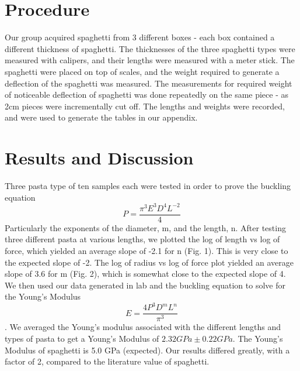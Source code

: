 \documentclass[12pt]{article}
\begin{document}
\section{Procedure}

Our group acquired spaghetti from 3 different boxes - each box contained a different thickness of spaghetti. The thicknesses of the three spaghetti types were measured with calipers, and their lengths were measured with a meter stick. The spaghetti were placed on top of scales, and the weight required to generate a deflection of the spaghetti was measured. The measurements for required weight of noticeable deflection of spaghetti was done repeatedly on the same piece - as 2cm pieces were incrementally cut off. The lengths and weights were recorded, and were used to generate the tables in our appendix.

\section{Results and Discussion}

Three pasta type of ten samples each were tested in order to prove the buckling equation
$$P=\frac{\pi ^3E^3D^4L^{-2}}{4}$$
Particularly the exponents of the diameter, m, and the length, n. After testing three different pasta at various lengths, we plotted the log of length vs log of force, which yielded an average slope of -2.1 for n (Fig. 1). This is very close to the expected slope of -2. The log of radius vs log of force plot yielded an average slope of 3.6 for m (Fig. 2), which is somewhat close to the expected slope of 4. We then used our data generated in lab and the buckling equation to solve for the Young's Modulus $$E=\frac{4P^3D^mL^n}{\pi ^3}$$. We averaged the Young's modulus associated with the different lengths and types of pasta to get a Young's Modulus of $2.32 GPa \pm 0.22 GPa$. The Young's Modulus of spaghetti is 5.0 GPa (expected). Our results differed greatly, with a factor of 2, compared to the literature value of spaghetti.
\end{document}
